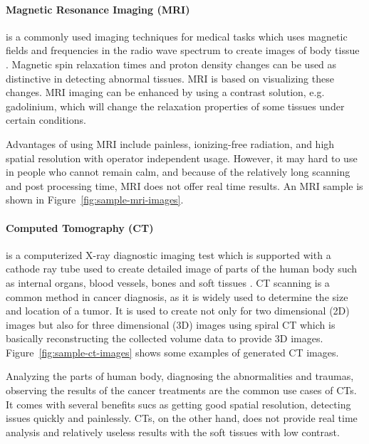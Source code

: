             

        \paragraph{Magnetic Resonance Imaging (MRI)} is a commonly used imaging techniques for medical tasks
            which uses magnetic fields and frequencies in the radio wave spectrum to create images of body tissue \cite{mehmood2013prioritization}.
            Magnetic spin relaxation times and proton density changes can be used as distinctive in detecting abnormal tissues.
            MRI is based on visualizing these changes.
            MRI imaging can be enhanced by using a contrast solution, e.g. gadolinium, which will change the relaxation properties of some tissues under certain conditions.

            

            Advantages of using MRI include painless, ionizing-free radiation, and high spatial resolution with operator independent usage.
            However, it may hard to use in people who cannot remain calm, and because of the relatively long scanning and post processing time, MRI does not offer real time results.
            An MRI sample is shown in Figure~\ref{fig:sample-mri-images}.

        \paragraph{Computed Tomography (CT)} is a computerized X-ray diagnostic imaging test which is supported with a cathode ray tube used to create detailed image of parts of the human body such as internal organs, blood vessels, bones and soft tissues \cite{Computed66online}.
            CT scanning is a common method in cancer diagnosis, as it is widely used to determine the size and location of a tumor.
            It is used to create not only for two dimensional (2D) images but also for three dimensional (3D) images using spiral CT which is basically reconstructing the collected volume data to provide 3D images.
            Figure~\ref{fig:sample-ct-images} shows some examples of generated CT images.

            

            Analyzing the parts of human body, diagnosing the abnormalities and traumas, observing the results of the cancer treatments are the common use cases of CTs.
            It comes with several benefits sucs as getting good spatial resolution, detecting issues quickly and painlessly.
            CTs, on the other hand, does not provide real time analysis and relatively useless results with the soft tissues with low contrast.

